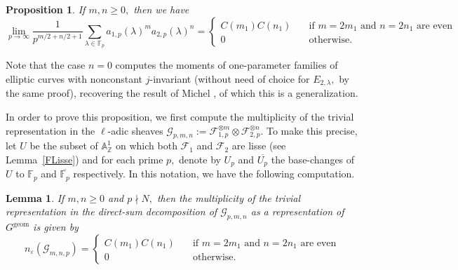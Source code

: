 \documentclass[12pt]{amsart}
\newtheorem{lemma}[theorem]{Lemma}
\newtheorem{proposition}[theorem]{Proposition}
\theoremstyle{definition}
\theoremstyle{remark}
\numberwithin{equation}{section}
\def\A{\mathbb A}
\def\F{{\mathbb F}}
\def\Z{{\mathbb Z}}
\def\Z{\mathbb{Z}}
\def\F{\mathbb{F}}
\DeclareMathOperator{\geom}{geom}
\begin{document}
\begin{proposition}\label{mixedMoments}
If $m,n\geq 0,$ then we have
$$
\lim\limits_{p\to\infty}\frac{1}{p^{m/2+n/2+1}}\sum\limits_{\lambda\in\F_p}a_{1,p}(\lambda)^m a_{2,p}(\lambda)^n = \begin{cases}
    C(m_1)C(n_1) &\ \ \ \text{ if } m=2m_1\text{ and }n=2n_1\text{ are even} \\ 
    0 &\ \ \ \text{ otherwise}.
\end{cases}
$$
\end{proposition}

Note that the case $n=0$ computes the moments of one-parameter families of elliptic curves with nonconstant $j$-invariant (without need of choice for $E_{2,\lambda},$ by the same proof), recovering the result of Michel \cite[Section 3]{RangMoyen}, of which this is a generalization.

In order to prove this proposition, we first compute the multiplicity of the trivial representation in the $\ell$-adic sheaves $\mathcal{G}_{p,m,n}:=\mathcal{F}_{1,p}^{\otimes m}\otimes\mathcal{F}_{2,p}^{\otimes n}.$ To make this precise, let $U$ be the subset of $\A_{\Z}^1$ on which both $\mathcal{F}_1$ and $\mathcal{F}_2$ are lisse (see Lemma~\ref{FLisse}) and for each prime $p,$ denote by $U_p$ and $\overline{U_p}$ the base-changes of $U$ to $\F_p$ and $\overline{\F_p}$ respectively. In this notation, we have the following computation.

\begin{lemma}\label{multTwoRep}
    If $m,n\geq 0$ and $p\nmid N,$ then the multiplicity of the trivial representation in the direct-sum decomposition of $\mathcal{G}_{p,m,n}$ as a representation of $G^{\geom}$ is given by
    $$
    n_{\varepsilon}(\mathcal{G}_{m,n,p}) = \begin{cases}
    C(m_1)C(n_1) &\ \ \ \text{ if } m=2m_1\text{ and }n=2n_1\text{ are even} \\ 
    0 &\ \ \ \text{ otherwise}.
    \end{cases}
    $$
\end{lemma}
\end{document}
